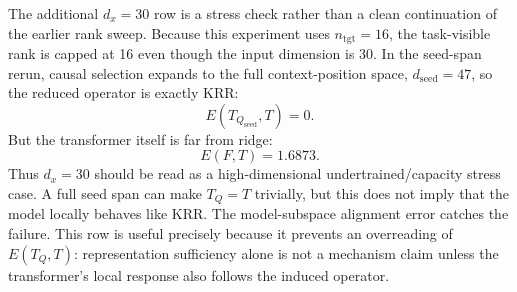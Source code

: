 \documentclass[11pt]{article}
\begin{document}
The additional \(d_x=30\) row is a stress check rather than a clean continuation of the earlier
rank sweep. Because this experiment uses \(n_{\mathrm{tgt}}=16\), the task-visible rank is capped at
16 even though the input dimension is 30. In the seed-span rerun, causal selection expands to the
full context-position space, \(d_{\mathrm{seed}}=47\), so the reduced operator is exactly KRR:
\[
E(T_{Q_{\mathrm{seed}}},T)=0.
\]
But the transformer itself is far from ridge:
\[
E(F,T)=1.6873.
\]
Thus \(d_x=30\) should be read as a high-dimensional undertrained/capacity stress case. A full
seed span can make \(T_Q=T\) trivially, but this does not imply that the model locally behaves like
KRR. The model-subspace alignment error catches the failure. This row is useful precisely because
it prevents an overreading of \(E(T_Q,T)\): representation sufficiency alone is not a mechanism
claim unless the transformer's local response also follows the induced operator.

\begin{table}[!htbp]
\centering
\caption{Experiment 2 fixed-\(d_x=5\) depth/head sweep with causal seed-span selection, mean over
16 episodes per checkpoint. All checkpoints use width \(D=128\).}
\scriptsize
{}
\label{tab:fixed-dx-depth-head}
\end{table}
\end{document}
